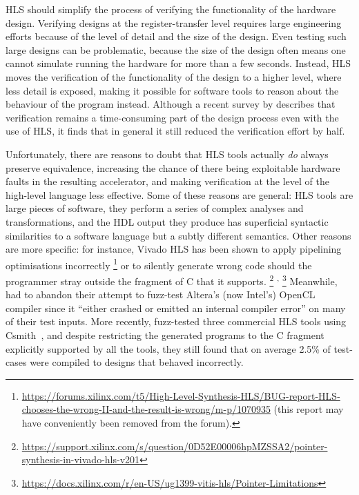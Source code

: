 \Gls{HLS} should simplify the process of verifying the functionality of the
hardware design.  Verifying designs at the register-transfer level requires
large engineering efforts because of the level of detail and the size of the
design.  Even testing such large designs can be problematic, because the size of
the design often means one cannot simulate running the hardware for more than a
few seconds.  Instead, \gls{HLS} moves the verification of the functionality of
the design to a higher level, where less detail is exposed, making it possible
for software tools to reason about the behaviour of the program
instead. Although a recent survey by \textcite{lahti19_are_we_there_yet}
describes that verification remains a time-consuming part of the design process
even with the use of \gls{HLS}, it finds that in general it still reduced the
verification effort by half.


Unfortunately, there are reasons to doubt that \gls{HLS} tools actually
\emph{do} always preserve equivalence, increasing the chance of there being
exploitable hardware faults in the resulting accelerator, and making
verification at the level of the high-level language less effective.  Some of
these reasons are general: \gls{HLS} tools are large pieces of software, they
perform a series of complex analyses and transformations, and the \gls{HDL}
output they produce has superficial syntactic similarities to a software
language but a subtly different semantics.  Other reasons are more specific: for
instance, Vivado HLS has been shown to apply pipelining optimisations
incorrectly%
\footnote{\url{https://forums.xilinx.com/t5/High-Level-Synthesis-HLS/BUG-report-HLS-chooses-the-wrong-II-and-the-result-is-wrong/m-p/1070935}
  (this report may have conveniently been removed from the forum).}  or to
silently generate wrong code should the programmer stray outside the fragment of
C that it supports.%
\footnote{\url{https://support.xilinx.com/s/question/0D52E00006hpMZSSA2/pointer-synthesis-in-vivado-hls-v201}}%
\textsuperscript{,}%
\footnote{\url{https://docs.xilinx.com/r/en-US/ug1399-vitis-hls/Pointer-Limitations}}
Meanwhile, \textcite{lidbury15_many_core_compil_fuzzin} had to abandon their
attempt to fuzz-test Altera's (now Intel's) OpenCL compiler since it
\enquote{either crashed or emitted an internal compiler error} on many of their
test inputs.  More recently, \textcite{herklotz21_esrhlst} fuzz-tested three
commercial \gls{HLS} tools using
Csmith~\cite{yang11_findin_under_bugs_c_compil}, and despite restricting the
generated programs to the C fragment explicitly supported by all the tools, they
still found that on average 2.5\% of test-cases were compiled to designs that
behaved incorrectly.

